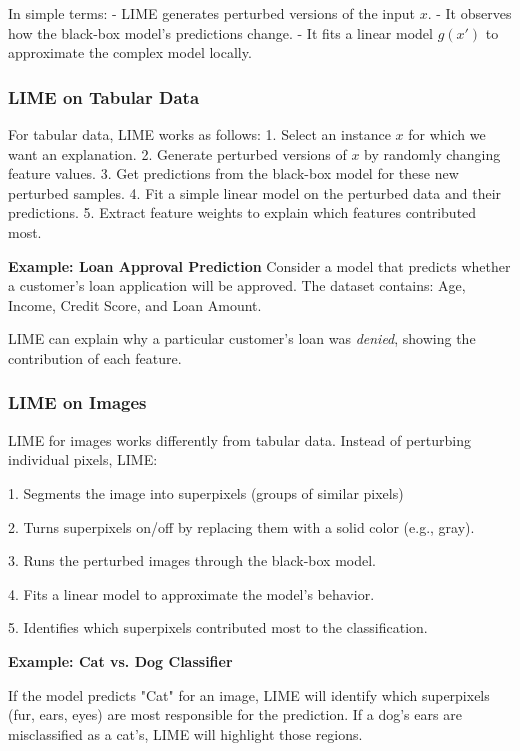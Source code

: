 In simple terms:
- LIME generates perturbed versions of the input \( x \).
- It observes how the black-box model's predictions change.
- It fits a linear model \( g(x') \) to approximate the complex model locally.

\subsubsection{LIME on Tabular Data}
For tabular data, LIME works as follows:
1. Select an instance \( x \) for which we want an explanation.
2. Generate perturbed versions of \( x \) by randomly changing feature values.
3. Get predictions from the black-box model for these new perturbed samples.
4. Fit a simple linear model on the perturbed data and their predictions.
5. Extract feature weights to explain which features contributed most.

\textbf{Example: Loan Approval Prediction}
Consider a model that predicts whether a customer’s loan application will be approved. The dataset contains: Age, Income, Credit Score, and Loan Amount.


LIME can explain why a particular customer’s loan was \textit{denied}, showing the contribution of each feature.

\subsubsection{LIME on Images}
LIME for images works differently from tabular data. Instead of perturbing individual pixels, LIME:
\begin{description}
    \item 1. Segments the image into superpixels (groups of similar pixels)
    \item 2. Turns superpixels on/off by replacing them with a solid color (e.g., gray).
    \item 3. Runs the perturbed images through the black-box model.
    \item 4. Fits a linear model to approximate the model's behavior.
    \item 5. Identifies which superpixels contributed most to the classification.
\end{description}


\textbf{Example: Cat vs. Dog Classifier}

If the model predicts "Cat" for an image, LIME will identify which superpixels (fur, ears, eyes) are most responsible for the prediction. If a dog's ears are misclassified as a cat’s, LIME will highlight those regions.


